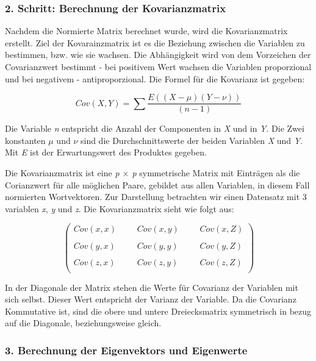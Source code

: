 \subsubsection{2. Schritt: Berechnung der Kovarianzmatrix}

Nachdem die Normierte Matrix berechnet wurde, wird die Kovarianzmatrix erstellt. Ziel der Kovarainzmatrix ist es die Beziehung zwischen die Variablen zu bestimmen, bzw. wie sie wachsen. Die Abhängigkeit wird von dem Vorzeichen der Covarianzwert bestimmt - bei positivem Wert wachsen die Variablen proporzional und bei negativem - antiproporzional. Die Formel für die Kovarianz ist gegeben:

\begin{equation}
	Cov(X,Y) = \sum \frac{E((X-\mu)(Y - \nu))}{(n - 1)} 
\end{equation}

Die Variable \emph{n} entspricht die Anzahl der Componenten in \emph{X} und in \emph{Y}. Die Zwei konstanten $\mu$ und $\nu$ sind die Durchschnittswerte der beiden Variablen \emph{X} und \emph{Y}. Mit \emph{E} ist der Erwartungswert des Produktes gegeben.

Die Kovarianzmatrix ist eine \emph{p $\times$ p} symmetrische Matrix mit Einträgen als die Corianzwert für alle möglichen Paare, gebildet aus allen Variablen, in diesem Fall normierten Wortvektoren. Zur Darstellung betrachten wir einen Datensatz mit 3 variablen \emph{x}, \emph{y} und \emph{z}. Die Kovarianzmatrix sieht wie folgt aus:

\begin{equation}
\begin{pmatrix}
	Cov(x,x)& & &Cov(x,y)& & &Cov(x,Z)\\
								  \\
	Cov(y,x)& & &Cov(y,y)& & &Cov(y,Z)\\	
                                  \\
	Cov(z,x)& & &Cov(z,y)& & &Cov(z,Z)\\
\end{pmatrix}
\end{equation}

In der Diagonale der Matrix stehen die Werte für Covarianz der Variablen mit sich selbst. Dieser Wert entspricht der Varianz der Variable. Da die Covarianz Kommutative ist, sind die obere und untere Dreiecksmatrix symmetrisch in bezug auf die Diagonale, beziehungsweise gleich.

\subsubsection{3. Berechnung der Eigenvektors und Eigenwerte}

